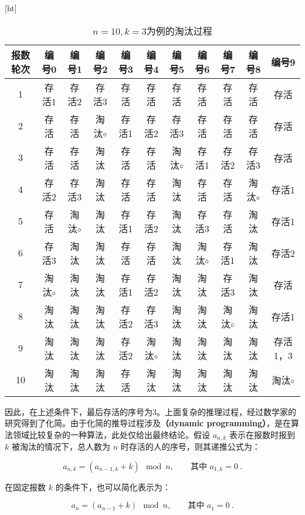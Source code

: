 \begin{table}\label{tab_HsSeFu_1}[ht]
\centering
\caption{$n=10,k=3$为例的淘汰过程}\label{tab_HsSeFu1}
\begin{tabular}{|c|c|c|c|c|c|c|c|c|c|c|}
\hline
报数轮次 & 编号0& 编号1& 编号2 & 编号3 & 编号4& 编号5 & 编号6& 编号7 & 编号8& 编号9\\
\hline
1 & 存活1 & 存活2 &存活3 &存活 &存活 &存活 &存活 &存活 &存活 &存活\\
\hline
2 & 存活 & 存活 &淘汰$\circ$ &存活1 &存活2 &存活3 &存活 &存活 &存活 &存活\\
\hline
3 & 存活 & 存活 &淘汰 &存活 &存活 &淘汰$\circ$ &存活1 &存活2 &存活3 &存活\\
\hline
4 & 存活2 & 存活3 &淘汰 &存活 &存活 &淘汰 &存活 &存活 &淘汰$\circ$ &存活1\\
\hline
5 & 存活 & 淘汰$\circ$ &淘汰 &存活1 &存活2 &淘汰 &存活3 &存活 &淘汰 &存活1\\
\hline
6 & 存活3 & 淘汰 &淘汰 &存活 &存活&淘汰 &淘汰$\circ$ &存活1&淘汰 &存活2\\
\hline
7 & 淘汰$\circ$ & 淘汰 &淘汰 &存活1 &存活2 &淘汰 &淘汰 &存活3 &淘汰 &存活\\
\hline
8 & 淘汰 & 淘汰 &淘汰 &存活2 &存活3 &淘汰 &淘汰 &淘汰$\circ$ &淘汰 &存活1\\
\hline
9 & 淘汰 & 淘汰 &淘汰 &存活2 &淘汰$\circ$ &淘汰 &淘汰 &淘汰 &淘汰 &存活1，3\\
\hline
10 & 淘汰 & 淘汰 &淘汰 &存活 &淘汰 &淘汰 &淘汰 &淘汰 &淘汰 & 淘汰$\circ$ \\
\hline
\end{tabular}
\end{table}

因此，在上述条件下，最后存活的序号为3。上面复杂的推理过程，经过数学家的研究得到了化简。由于化简的推导过程涉及\textbf{（dynamic programming）}，是在算法领域比较复杂的一种算法，此处仅给出最终结论。假设 $a_{n,k}$ 表示在报数时报到 $k$ 被淘汰的情况下，总人数为 $n$ 时存活的人的序号，则其递推公式为：

\begin{equation}
a_{n,k} = (a_{n-1,k} + k) \mod n, \qquad \text{其中 } a_{1,k} = 0~.
\end{equation}

在固定报数 $k$ 的条件下，也可以简化表示为：

\begin{equation}
a_n = (a_{n-1} + k) \mod n, \qquad \text{其中 } a_{1} = 0~.
\end{equation}

